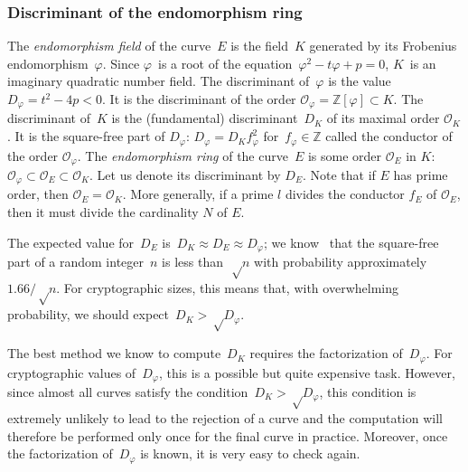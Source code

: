 \documentclass[twocolumn,letterpaper]{article}
\let\ro\mathcal
\begin{document}
\subsubsection{Discriminant of the endomorphism ring}
\label{sss:discriminant}



The \emph{endomorphism field} of the curve~$E$
is the field~$K$ generated by its Frobenius endomorphism~$φ$.
Since $φ$~is a root of the equation~$φ^2 - t φ + p = 0$,
$K$~is an imaginary quadratic number field.
The discriminant of~$φ$ is the value~$D_φ = t^2 - 4 p < 0$.
It is the discriminant of the order $\ro O_φ = ℤ[φ] \subset K$.
The discriminant of~$K$ is the (fundamental) discriminant~$D_K$ of its
maximal order $\ro O_K$.
It is the square-free part of $D_φ$: $D_φ = D_K f_φ^2$ for~$f_φ ∈ ℤ$
called the conductor of the order $\ro O_φ$.
The \emph{endomorphism ring} of the curve~$E$ is some order $\ro O_E$ in $K$:
$\ro O_φ \subset \ro O_E \subset \ro O_K$.
Let us denote its discriminant by $D_E$.
Note that if $E$ has prime order, then $\ro O_E = \ro O_K$.
More generally, if a prime $l$ divides the conductor $f_E$ of $\ro O_E$,
then it must divide the cardinality $N$ of $E$.

The expected value for~$D_E$ is~$D_K ≈ D_E ≈ D_φ$;
we know~\cite{jis2014cdkd} that the square-free part of
a random integer~$n$ is less than~$√n$
with probability approximately~$1.66/√n$.
For cryptographic sizes, this means that,
with overwhelming probability, we should expect~$D_K > √{D_φ}$.

The best method we know to compute~$D_K$ requires the
factorization of~$D_φ$.
For cryptographic values of~$D_φ$, this is a possible but
quite expensive task.
However, since almost all curves satisfy the condition~$D_K > √{D_φ}$,
this condition is extremely unlikely to lead to the rejection of a curve
and the computation will therefore be performed only once for the final curve
in practice.
Moreover, once the factorization of~$D_φ$ is known,
it is very easy to check again.
\end{document}

